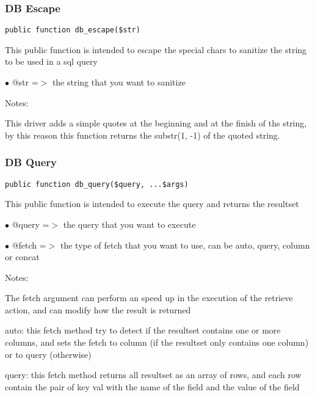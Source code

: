 \documentclass[a4paper]{article}
\begin{document}
\hypertarget{toc332}{}
\subsubsection{DB Escape}

\begin{lstlisting}
public function db_escape($str)
\end{lstlisting}

This public function is intended to escape the special chars to sanitize the string to be used
in a sql query

\begin{compactitem}
\item[\color{myblue}$\bullet$] @str =$>$ the string that you want to sanitize
\end{compactitem}

Notes:

This driver adds a simple quotes at the beginning and at the finish of ths string, by this
reason this function returns the substr(1, -1) of the quoted string.

\hypertarget{toc333}{}
\subsubsection{DB Query}

\begin{lstlisting}
public function db_query($query, ...$args)
\end{lstlisting}

This public function is intended to execute the query and returns the resultset

\begin{compactitem}
\item[\color{myblue}$\bullet$] @query =$>$ the query that you want to execute
\item[\color{myblue}$\bullet$] @fetch =$>$ the type of fetch that you want to use, can be auto, query, column or concat
\end{compactitem}

Notes:

The fetch argument can perform an speed up in the execution of the retrieve action, and
can modify how the result is returned

auto: this fetch method try to detect if the resultset contains one or more columns, and
sets the fetch to column (if the resultset only contains one column) or to query (otherwise)

query: this fetch method returns all resultset as an array of rows, and each row contain the
pair of key val with the name of the field and the value of the field
\end{document}
